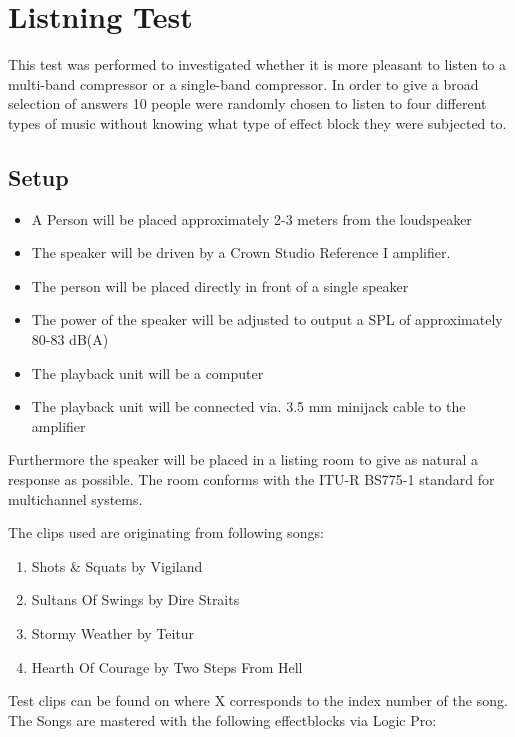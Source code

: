 \chapter{Listning Test}\label{app:journal_ListningTest}

This test was performed to investigated whether it is more pleasant to listen to a multi-band compressor or a single-band compressor. In order to give a broad selection of answers 10 people were randomly chosen to listen to four different types of music without knowing what type of effect block they were subjected to.


\section{Setup}



\begin{itemize}
\item A Person will be placed approximately 2-3 meters from the loudspeaker
\item The speaker will be driven by a Crown Studio Reference I amplifier.
\item The person will be placed directly in front of a single speaker
\item The power of the speaker will be adjusted to output a \gls{SPL} of approximately 80-83 dB(A)
\item The playback unit will be a computer
\item The playback unit will be connected via. 3.5 mm minijack cable to the amplifier
\end{itemize}
\vspace{-5mm}
Furthermore the speaker will be placed in a listing room to give as natural a response as possible. The room conforms with the ITU-R BS775-1 standard for multichannel systems.

The clips used are originating from following songs:
\vspace{-5mm}
\begin{enumerate}
\item Shots \& Squats by Vigiland
\item Sultans Of Swings by Dire Straits
\item Stormy Weather by Teitur
\item Hearth Of Courage by Two Steps From Hell
\end{enumerate}
Test clips can be found on  where X corresponds to the index number of the song.
The Songs are mastered with the following effectblocks via Logic Pro:

